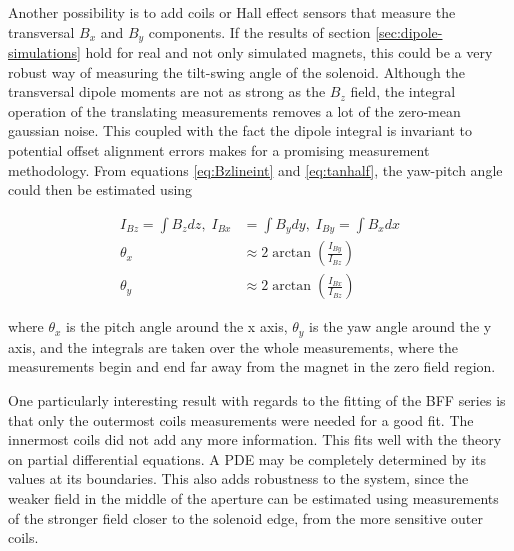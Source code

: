 Another possibility is to add coils or Hall effect sensors that measure
the transversal $B_x$ and $B_y$ components. If the results of section 
\ref{sec:dipole-simulations} hold for real and not only simulated magnets,
this could be a very robust way of measuring the tilt-swing angle of the
solenoid. Although the transversal dipole moments are not as strong as
the $B_z$ field, the integral operation of the translating measurements
removes a lot of the zero-mean gaussian noise. This coupled with the fact the dipole
integral is invariant to potential offset alignment errors makes for
a promising measurement methodology. From equations 
\ref{eq:Bzlineint} and \ref{eq:tanhalf}, the 
yaw-pitch angle could then be estimated using

\begin{align}
    I_{Bz} = \int B_z dz, \; 
    I_{Bx} &= \int B_y dy, \; 
    I_{By} = \int B_x dx \\
    \theta_x &\approx 2\arctan(\frac{I_{By}}{I_{Bz}})\\
    \theta_y &\approx 2\arctan(\frac{I_{Bx}}{I_{Bz}})
\end{align}

where $\theta_x$ is the pitch angle around the x axis,
$\theta_y$ is the yaw angle around the y axis, and the 
integrals are taken over the whole measurements, where
the measurements begin and end far away from the magnet
in the zero field region.

One particularly interesting result with regards to the fitting
of the BFF series is that only the outermost coils measurements
were needed for a good fit. The innermost coils did not add any
more information. This fits well with the theory on partial
differential equations. A PDE may be completely determined
by its values at its boundaries. This also adds robustness to the system,
since the weaker field in the middle of the aperture can be estimated
using measurements of the stronger field closer to the solenoid edge,
from the more sensitive outer coils.